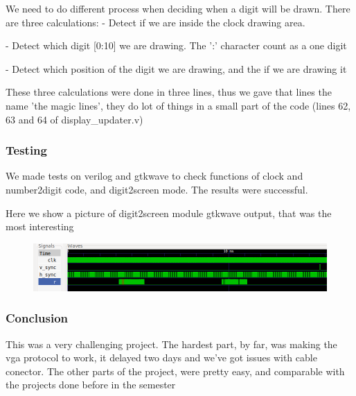 We need to do different process when deciding when a digit will be drawn. There are three calculations:
- Detect if we are inside the clock drawing area.

- Detect which digit [0:10] we are drawing. The ':' character count as a one digit

- Detect which position of the digit we are drawing, and the if we are drawing it

These three calculations were done in three lines, thus we gave that lines the name 'the magic lines', they do lot of things in a small part of the code (lines 62, 63 and 64 of display_updater.v)

\subsubsection*{Testing}
We made tests on verilog and gtkwave to check functions of clock and number2digit code, and digit2screen mode. The results were successful.

Here we show a picture of digit2screen module gtkwave output, that was the most interesting

\begin{figure}[htbp]
    \begin{center}
    \includegraphics[scale=0.5]{dibujos/digit2screen.png}
    
    \end{center}
    
    \label{fig:Digit2Screen}
    \end{figure}



\subsubsection*{Conclusion}

This was a very challenging project. The hardest part, by far, was making the vga protocol to work, it delayed two days and we've got issues with cable conector. The other parts of the project, were pretty easy, and comparable with the projects done before in the semester 





